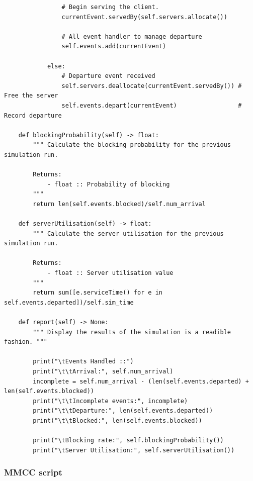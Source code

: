 \documentclass{ecmm427_assignment}
\begin{document}
\begin{verbatim}
                # Begin serving the client.
                currentEvent.servedBy(self.servers.allocate())

                # All event handler to manage departure
                self.events.add(currentEvent)

            else:
                # Departure event received
                self.servers.deallocate(currentEvent.servedBy()) # Free the server
                self.events.depart(currentEvent)                 # Record departure

    def blockingProbability(self) -> float:
        """ Calculate the blocking probability for the previous simulation run.
        
        Returns:
            - float :: Probability of blocking 
        """
        return len(self.events.blocked)/self.num_arrival
 
    def serverUtilisation(self) -> float:
        """ Calculate the server utilisation for the previous simulation run.
        
        Returns:
            - float :: Server utilisation value
        """
        return sum([e.serviceTime() for e in self.events.departed])/self.sim_time

    def report(self) -> None:
        """ Display the results of the simulation is a readible fashion. """
        
        print("\tEvents Handled ::") 
        print("\t\tArrival:", self.num_arrival)
        incomplete = self.num_arrival - (len(self.events.departed) + len(self.events.blocked))
        print("\t\tIncomplete events:", incomplete)
        print("\t\tDeparture:", len(self.events.departed))
        print("\t\tBlocked:", len(self.events.blocked))

        print("\tBlocking rate:", self.blockingProbability())
        print("\tServer Utilisation:", self.serverUtilisation()) 
\end{verbatim}
\subsubsection{MMCC script}
\end{document}

